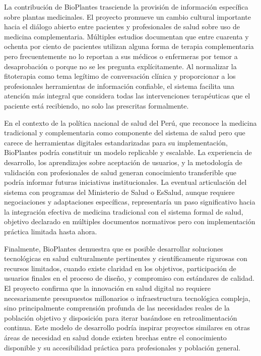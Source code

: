 \documentclass[12pt,a4paper]{article}
\begin{document}
La contribución de BioPlantes trasciende la provisión de información específica sobre plantas medicinales. El proyecto promueve un cambio cultural importante hacia el diálogo abierto entre pacientes y profesionales de salud sobre uso de medicina complementaria. Múltiples estudios documentan que entre cuarenta y ochenta por ciento de pacientes utilizan alguna forma de terapia complementaria pero frecuentemente no lo reportan a sus médicos o enfermeras por temor a desaprobación o porque no se les pregunta explícitamente. Al normalizar la fitoterapia como tema legítimo de conversación clínica y proporcionar a los profesionales herramientas de información confiable, el sistema facilita una atención más integral que considera todas las intervenciones terapéuticas que el paciente está recibiendo, no solo las prescritas formalmente.

En el contexto de la política nacional de salud del Perú, que reconoce la medicina tradicional y complementaria como componente del sistema de salud pero que carece de herramientas digitales estandarizadas para su implementación, BioPlantes podría constituir un modelo replicable y escalable. La experiencia de desarrollo, los aprendizajes sobre aceptación de usuarios, y la metodología de validación con profesionales de salud generan conocimiento transferible que podría informar futuras iniciativas institucionales. La eventual articulación del sistema con programas del Ministerio de Salud o EsSalud, aunque requiere negociaciones y adaptaciones específicas, representaría un paso significativo hacia la integración efectiva de medicina tradicional con el sistema formal de salud, objetivo declarado en múltiples documentos normativos pero con implementación práctica limitada hasta ahora.

Finalmente, BioPlantes demuestra que es posible desarrollar soluciones tecnológicas en salud culturalmente pertinentes y científicamente rigurosas con recursos limitados, cuando existe claridad en los objetivos, participación de usuarios finales en el proceso de diseño, y compromiso con estándares de calidad. El proyecto confirma que la innovación en salud digital no requiere necesariamente presupuestos millonarios o infraestructura tecnológica compleja, sino principalmente comprensión profunda de las necesidades reales de la población objetivo y disposición para iterar basándose en retroalimentación continua. Este modelo de desarrollo podría inspirar proyectos similares en otras áreas de necesidad en salud donde existen brechas entre el conocimiento disponible y su accesibilidad práctica para profesionales y población general.
\end{document}
